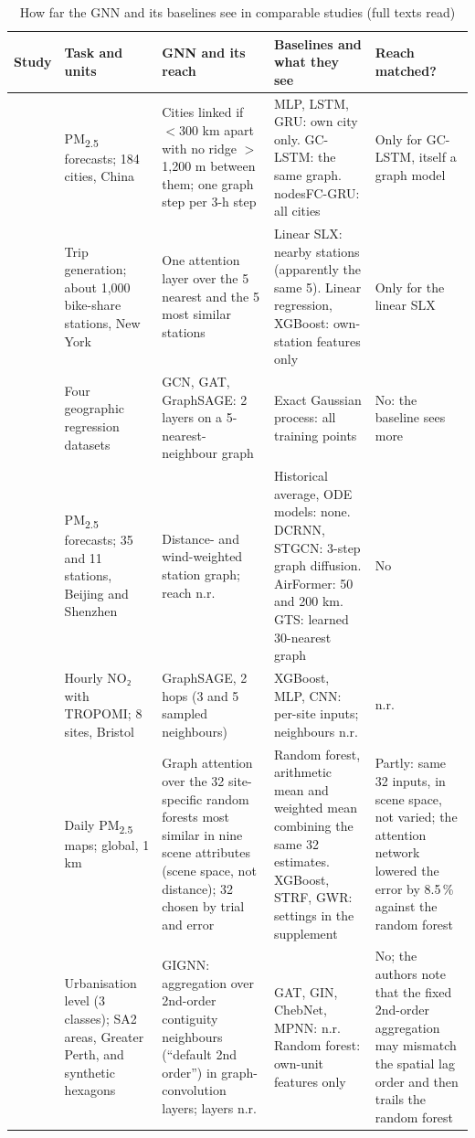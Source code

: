 \documentclass[pdflatex,sn-basic]{sn-jnl}
\begin{document}
\begin{table}[!htbp]
\caption{How far the GNN and its baselines see in comparable studies (full texts read)}\label{tab:audit}
\footnotesize
\setlength{\tabcolsep}{4pt}
\begin{tabularx}{\textwidth}{@{}Y{0.76}Y{0.8}Y{1.06}Y{1.28}Y{1.1}@{}}
\toprule
Study & Task and units & GNN and its reach & Baselines and what they see & Reach matched? \\
\midrule
\citet{wang2020} & PM\textsubscript{2.5} forecasts; 184 cities, China & Cities linked if $<$300 km apart with no ridge $>$1,200 m between them; one graph step per 3-h step & MLP, LSTM, GRU: own city only. GC-LSTM: the same graph. nodesFC-GRU: all cities & Only for GC-LSTM, itself a graph model \\
\citet{liang2023} & Trip generation; about 1,000 bike-share stations, New York & One attention layer over the 5 nearest and the 5 most similar stations & Linear SLX: nearby stations (apparently the same 5). Linear regression, XGBoost: own-station features only & Only for the linear SLX \\
\citet{klemmer2023} & Four geographic regression datasets & GCN, GAT, GraphSAGE: 2 layers on a 5-nearest-neighbour graph & Exact Gaussian process: all training points & No: the baseline sees more \\
\citet{hettige2024} & PM\textsubscript{2.5} forecasts; 35 and 11 stations, Beijing and Shenzhen & Distance- and wind-weighted station graph; reach n.r. & Historical average, ODE models: none. DCRNN, STGCN: 3-step graph diffusion. AirFormer: 50 and 200 km. GTS: learned 30-nearest graph & No \\
\citet{gueterbock2025} & Hourly NO₂ with TROPOMI; 8 sites, Bristol & GraphSAGE, 2 hops (3 and 5 sampled neighbours) & XGBoost, MLP, CNN: per-site inputs; neighbours n.r. & n.r. \\
\citet{bai2025} & Daily PM\textsubscript{2.5} maps; global, 1 km & Graph attention over the 32 site-specific random forests most similar in nine scene attributes (scene space, not distance); 32 chosen by trial and error & Random forest, arithmetic mean and weighted mean combining the same 32 estimates. XGBoost, STRF, GWR: settings in the supplement & Partly: same 32 inputs, in scene space, not varied; the attention network lowered the error by 8.5\,\% against the random forest \\
\citet{ma2025} & Urbanisation level (3 classes); SA2 areas, Greater Perth, and synthetic hexagons & GIGNN: aggregation over 2nd-order contiguity neighbours (``default 2nd order'') in graph-convolution layers; layers n.r. & GAT, GIN, ChebNet, MPNN: n.r. Random forest: own-unit features only & No; the authors note that the fixed 2nd-order aggregation may mismatch the spatial lag order and then trails the random forest \\

\end{tabularx}
\end{table}
\end{document}
